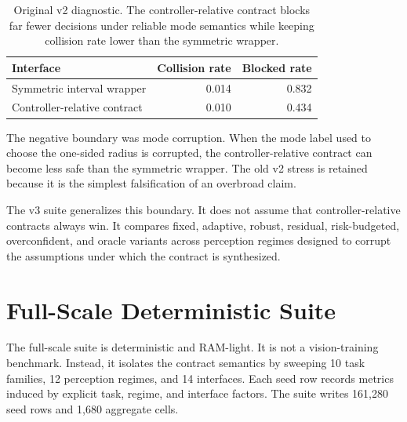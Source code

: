 \documentclass{article}
\newcommand{\seedrows}{161,280}
\newcommand{\aggrows}{1,680}
\begin{document}
\begin{table}[t]
\centering
\small
\caption{Original v2 diagnostic. The controller-relative contract blocks far fewer decisions under reliable mode semantics while keeping collision rate lower than the symmetric wrapper.}
\label{tab:v2-demo}
\begin{tabular}{lrr}
\toprule
Interface & Collision rate & Blocked rate \\
\midrule
Symmetric interval wrapper & 0.014 & 0.832 \\
Controller-relative contract & 0.010 & 0.434 \\
\bottomrule
\end{tabular}
\end{table}

The negative boundary was mode corruption. When the mode label used to choose the one-sided radius is corrupted, the controller-relative contract can become less safe than the symmetric wrapper. The old v2 stress is retained because it is the simplest falsification of an overbroad claim.



The v3 suite generalizes this boundary. It does not assume that controller-relative contracts always win. It compares fixed, adaptive, robust, residual, risk-budgeted, overconfident, and oracle variants across perception regimes designed to corrupt the assumptions under which the contract is synthesized.

\section{Full-Scale Deterministic Suite}

\begin{table}[t]
\centering
\small
\caption{V3 full-scale protocol. The represented checks count task families, regimes, interfaces, seeds, control steps, candidate perception hypotheses, and invariant-propagation lookahead.}
\label{tab:scale}
\end{table}

The full-scale suite is deterministic and RAM-light. It is not a vision-training benchmark. Instead, it isolates the contract semantics by sweeping 10 task families, 12 perception regimes, and 14 interfaces. Each seed row records metrics induced by explicit task, regime, and interface factors. The suite writes \seedrows{} seed rows and \aggrows{} aggregate cells.
\end{document}
